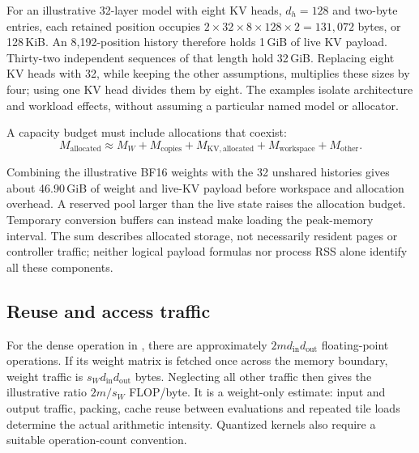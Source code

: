 For an illustrative 32-layer model with eight KV heads, \(d_h=128\)
and two-byte entries, each retained position occupies
\(2\times32\times8\times128\times2=131{,}072\) bytes, or 128\,KiB.
An 8{,}192-position history therefore holds 1\,GiB of live KV payload.
Thirty-two independent sequences of that length hold 32\,GiB.
Replacing eight KV heads with 32, while keeping the other assumptions,
multiplies these sizes by four; using one KV head divides them by eight.
The examples isolate architecture and workload effects, without assuming
a particular named model or allocator.

A capacity budget must include allocations that coexist:
\begin{equation}
\label{eq:inference-allocation-budget}
 M_{\mathrm{allocated}} \approx M_W+M_{\mathrm{copies}}+
 M_{\mathrm{KV,allocated}}+M_{\mathrm{workspace}}+M_{\mathrm{other}}.
\end{equation}

Combining the illustrative BF16 weights with the 32 unshared histories
gives about 46.90\,GiB of weight and live-KV payload before workspace and
allocation overhead.  A reserved pool larger than the live state raises
the allocation budget.  Temporary conversion buffers can instead make
loading the peak-memory interval.  The sum describes allocated storage,
not necessarily resident pages or controller traffic; neither logical
payload formulas nor process RSS alone identify all these components.

\subsection{Reuse and access traffic}

For the dense operation in , there are
approximately \(2m d_{\mathrm{in}}d_{\mathrm{out}}\) floating-point
operations.  If its weight matrix is fetched once across the memory
boundary, weight traffic is \(s_W d_{\mathrm{in}}d_{\mathrm{out}}\)
bytes.  Neglecting all other traffic then gives the illustrative ratio
\(2m/s_W\) FLOP/byte.  It is a weight-only estimate: input and output
traffic, packing, cache reuse between evaluations and repeated tile
loads determine the actual arithmetic intensity.  Quantized kernels
also require a suitable operation-count convention.

